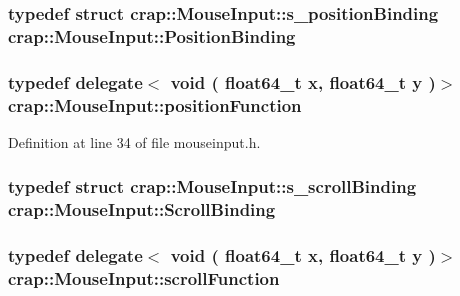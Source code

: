 \hypertarget{classcrap_1_1_mouse_input_a104e87f3c70805567977acc81cc15f38}{}
\subsubsection[{Position\+Binding}]{\setlength{\rightskip}{0pt plus 5cm}typedef struct {\bf crap\+::\+Mouse\+Input\+::s\+\_\+position\+Binding}
	 {\bf crap\+::\+Mouse\+Input\+::\+Position\+Binding}}\label{classcrap_1_1_mouse_input_a104e87f3c70805567977acc81cc15f38}
\hypertarget{classcrap_1_1_mouse_input_aa2d296ac0bf7bf9f29c13377534bf919}{}
\subsubsection[{position\+Function}]{\setlength{\rightskip}{0pt plus 5cm}typedef {\bf delegate}$<$ void ( {\bf float64\+\_\+t} x, {\bf float64\+\_\+t} y )$>$ {\bf crap\+::\+Mouse\+Input\+::position\+Function}}\label{classcrap_1_1_mouse_input_aa2d296ac0bf7bf9f29c13377534bf919}


Definition at line 34 of file mouseinput.\+h.

\hypertarget{classcrap_1_1_mouse_input_aa5c6a3bcfba809e9784dbd3aa3c46b65}{}
\subsubsection[{Scroll\+Binding}]{\setlength{\rightskip}{0pt plus 5cm}typedef struct {\bf crap\+::\+Mouse\+Input\+::s\+\_\+scroll\+Binding}
	 {\bf crap\+::\+Mouse\+Input\+::\+Scroll\+Binding}}\label{classcrap_1_1_mouse_input_aa5c6a3bcfba809e9784dbd3aa3c46b65}
\hypertarget{classcrap_1_1_mouse_input_a76d83afa5ade8d873bc0866b37e36f37}{}
\subsubsection[{scroll\+Function}]{\setlength{\rightskip}{0pt plus 5cm}typedef {\bf delegate}$<$ void ( {\bf float64\+\_\+t} x, {\bf float64\+\_\+t} y )$>$ {\bf crap\+::\+Mouse\+Input\+::scroll\+Function}}\label{classcrap_1_1_mouse_input_a76d83afa5ade8d873bc0866b37e36f37}


